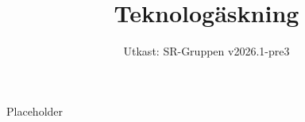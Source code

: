 \documentclass[a4paper]{dtek}
\title{Teknologäskning}
\date{Utkast: SR-Gruppen v2026.1-pre3}
\begin{document}
Placeholder
\end{document}
